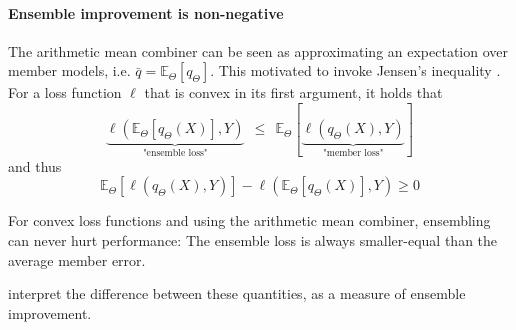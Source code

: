 \documentclass[
    a4paper, %
	fontsize=10pt, %
	twoside=false, %
]{kaobook}
\begin{document}
\begin{titlepage}
\paragraph{Ensemble improvement is non-negative} The arithmetic mean combiner can be seen as approximating an expectation over member models, i.e. $\bar{q} = \mathbb{E}_{\Theta} \left[q_{\Theta}\right]$.
This motivated  to invoke Jensen's inequality
. For a loss function $\ell$ that is convex in its first argument, it holds that
$$
\underbrace{
\ell(\mathbb{E}_{\Theta}\left[ q_{\Theta}(X)\right] , Y  ) 
}_{\text{"ensemble loss"}}
~ ~ \leq ~ ~ 
\mathbb{E}_{\Theta}\left[ 
\underbrace{
\ell(q_{\Theta}(X), Y)  
}_{\text{"member loss"}}
\right]
$$
and thus
$$
\mathbb{E}_{{\Theta}}\left[ \ell (q_{\Theta}(X),Y) \right]  -
\ell(\mathbb{E}_{\Theta}\left[ q_{\Theta}(X) \right] ,Y ) \geq 0
$$
\begin{corollary}
  For convex loss functions and using the arithmetic mean combiner, ensembling can never hurt performance: The ensemble loss is always smaller-equal than the average member error.
\end{corollary}
 interpret the difference between these quantities, as a measure of ensemble improvement. 


\end{titlepage}
\end{document}
